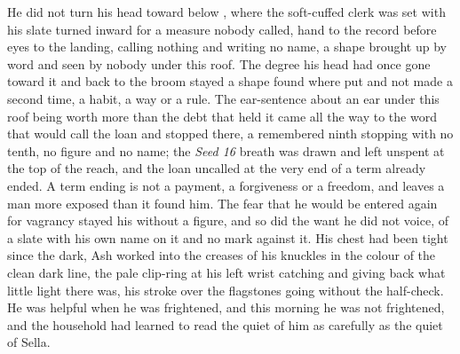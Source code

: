He did not turn his head toward  below , where the soft-cuffed clerk was set with his slate turned inward for a measure nobody called, hand to the record before eyes to the landing, calling nothing and writing no name, a shape brought up by word and seen by nobody under this roof. The degree his head had once gone toward it and back to the broom stayed a shape found where put and not made a second time, a habit, a way or a rule. The ear-sentence about an ear under this roof being worth more than the debt that held it came all the way to the word that would call the loan and stopped there, a remembered ninth stopping with no tenth, no figure and no name; the \emph{Seed 16} breath was drawn and left unspent at the top of the reach, and the loan uncalled at the very end of a term already ended. A term ending is not a payment, a forgiveness or a freedom, and leaves a man more exposed than it found him. The fear that he would be entered again for vagrancy stayed his without a figure, and so did the want he did not voice, of a slate with his own name on it and no mark against it. His chest had been tight since the dark, Ash worked into the creases of his knuckles in the colour of the clean dark line, the pale clip-ring at his left wrist catching and giving back what little light there was, his stroke over the flagstones going without the half-check. He was helpful when he was frightened, and this morning he was not frightened, and the household had learned to read the quiet of him as carefully as the quiet of Sella.


